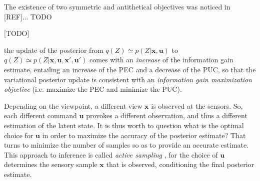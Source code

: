 \documentclass{article}
\begin{document}
The existence of two symmetric and antithetical objectives was noticed in [REF]... TODO



{\color{blue} [TODO]}

the update of the posterior from  $q(Z) \simeq p(Z|\boldsymbol{x}, \boldsymbol{u})$ to $q(Z) \simeq p(Z|\boldsymbol{x}, \boldsymbol{u}, \boldsymbol{x}', \boldsymbol{u}')$ comes with an \emph{increase} of the information gain estimate, entailing an increase of the PEC and a decrease of the PUC, so that the variational posterior update is consistent with an \emph{information gain maximization objective} (i.e. maximize the PEC and minimize the PUC). 



Depending on the viewpoint, a different view $\boldsymbol{x}$ is observed at the sensors. So, each different command $\boldsymbol{u}$ provokes a different observation, and thus a different 
estimation of the latent state. It is thus worth to question what is the optimal choice for $\boldsymbol{u}$ in order to maximize the accuracy of the posterior estimate?
That turns  to minimize the number of samples so as to provide an accurate estimate. This approach to inference is called \emph{active sampling} \cite{friston2012perceptions}, for the choice of $\boldsymbol{u}$ determines the sensory sample $\boldsymbol{x}$ that is observed, conditioning the final posterior estimate.
\end{document}
